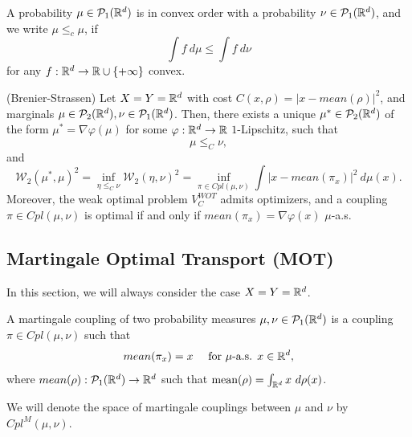 \documentclass[../main.tex]{subfiles}
\begin{document}
\begin{definition}
    A probability $\mu\in\mathcal{P}_1(\mathbb{R}^d)$ is in convex order with a probability $\nu\in\mathcal{P}_1(\mathbb{R}^d)$, and we write $\mu \leq_c \mu$, if $$\int f \ d\mu \leq \int f \ d\nu$$ for any $f: \mathbb{R}^d \to \mathbb{R}\cup\{+\infty\}$ convex.
\end{definition}

\begin{theorem} (Brenier-Strassen)
    Let $X=Y=\mathbb{R}^d$ with cost $C(x, \rho) = |x-mean(\rho)|^2$, and marginals $\mu\in\mathcal{P}_2(\mathbb{R}^d), \nu\in\mathcal{P}_1(\mathbb{R}^d)$. Then, there exists a unique $\mu^*\in\mathcal{P}_2(\mathbb{R}^d)$ of the form $\mu^*=\nabla\varphi(\mu)$ for some $\varphi: \mathbb{R}^d\to \mathbb{R}$ $1$-Lipschitz, such that $$\mu \leq_C \nu,$$ and $$\mathcal{W}_2(\mu^*, \mu)^2 = \inf_{\eta \leq_C \nu} \mathcal{W}_2(\eta, \nu)^2 = \inf_{\pi\in Cpl(\mu, \nu)} \int |x-mean(\pi_x)|^2 \ d\mu(x).$$
    Moreover, the weak optimal problem $V^{WOT}_C$ admits optimizers, and a coupling $\pi\in Cpl(\mu, \nu)$ is optimal if and only if $mean(\pi_x) = \nabla\varphi(x)$ $\mu$-a.s.
\end{theorem}

\subsection{Martingale Optimal Transport (MOT)}
In this section, we will always consider the case $X=Y=\mathbb{R}^d$.

\begin{definition}
    A martingale coupling of two probability measures $\mu, \nu\in\mathcal{P}_1(\mathbb{R}^d)$ is a coupling $\pi\in Cpl(\mu, \nu)$ such that 
    $$
    mean(\pi_x) = x \quad \text{ for $\mu$-a.s. $x\in \mathbb{R}^d$},
    $$
    where $mean(\rho) : \mathcal{P}_1(\mathbb{R}^d) \to \mathbb{R}^d$ such that $\text{mean}(\rho) = \int_{\R^d} x \ d\rho(x)$.
\end{definition}
We will denote the space of martingale couplings between $\mu$ and $\nu$ by $Cpl^M(\mu, \nu)$. 
\end{document}
